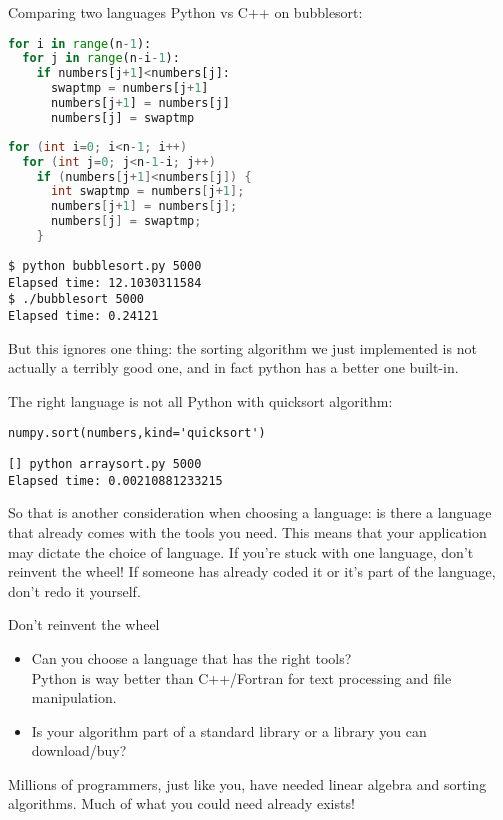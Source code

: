 \begin{block}{Comparing two languages}
  \label{sl:languages}
  Python vs C++ on bubblesort:
  \begin{multicols}{2}
    \scriptsize
\begin{lstlisting}[language=Python]
for i in range(n-1):
  for j in range(n-i-1):
    if numbers[j+1]<numbers[j]:
      swaptmp = numbers[j+1]
      numbers[j+1] = numbers[j]
      numbers[j] = swaptmp
\end{lstlisting}
    \columnbreak
\begin{lstlisting}[language=C++]
for (int i=0; i<n-1; i++)
  for (int j=0; j<n-1-i; j++)
    if (numbers[j+1]<numbers[j]) {
      int swaptmp = numbers[j+1];
      numbers[j+1] = numbers[j];
      numbers[j] = swaptmp;
    }
\end{lstlisting}
  \end{multicols}
\begin{verbatim}
$ python bubblesort.py 5000
Elapsed time: 12.1030311584
$ ./bubblesort 5000
Elapsed time: 0.24121
\end{verbatim}
\end{block}

But this ignores one thing: the sorting algorithm we just implemented
is not actually a terribly good one, and in fact python has a better
one built-in.

\begin{block}{The right language is not all}
\label{sl:quick-algo}
Python with quicksort algorithm:
\begin{verbatim}
numpy.sort(numbers,kind='quicksort')
\end{verbatim}  
\begin{verbatim}
[] python arraysort.py 5000
Elapsed time: 0.00210881233215
\end{verbatim}
\end{block}

So that is another consideration when choosing a language: is there a
language that already comes with the tools you need. This means that
your application may dictate the choice of language. If you're stuck
with one language, don't reinvent the wheel! If someone has already
coded it or it's part of the language, don't redo it yourself.

\begin{slide}{Don't reinvent the wheel}
  \label{sl:nowheel}
  \begin{itemize}
  \item Can you choose a language that has the right tools?\\
    Python is way better than C++/Fortran for text processing and file
    manipulation.
  \item Is your algorithm part of a standard library or a library you
    can download/buy?\\
  \end{itemize}
  Millions of programmers, just like you, have needed linear algebra
  and sorting algorithms. Much of what you could need already exists!
\end{slide}

